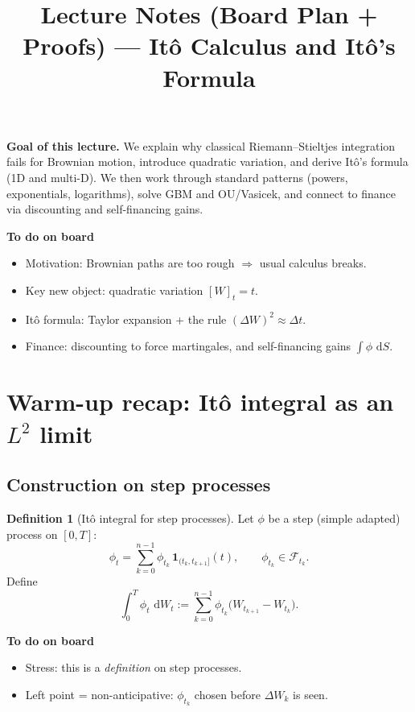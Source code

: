 \documentclass[11pt]{article}
\title{Lecture Notes (Board Plan + Proofs) --- It\^o Calculus and It\^o's Formula}
\author{}
\date{}
\newcommand{\F}{\mathcal{F}}
\newcommand{\1}{\mathbf{1}}
\newcommand{\dd}{\,\mathrm{d}}
\numberwithin{equation}{section}
\theoremstyle{plain}
\theoremstyle{definition}
\newtheorem{definition}[theorem]{Definition}
\theoremstyle{remark}
\begin{document}
\maketitle
\vspace{-1em}

\noindent\textbf{Goal of this lecture.}
We explain why classical Riemann--Stieltjes integration fails for Brownian motion,
introduce quadratic variation, and derive It\^o's formula (1D and multi-D).
We then work through standard patterns (powers, exponentials, logarithms),
solve GBM and OU/Vasicek, and connect to finance via discounting and self-financing gains.

\textbf{To do on board}
\begin{itemize}[leftmargin=2em]
  \item Motivation: Brownian paths are too rough $\Rightarrow$ usual calculus breaks.
  \item Key new object: quadratic variation $[W]_t = t$.
  \item It\^o formula: Taylor expansion + the rule $(\Delta W)^2 \approx \Delta t$.
  \item Finance: discounting to force martingales, and self-financing gains $\int \phi\,\dd S$.
\end{itemize}


\section{Warm-up recap: It\^o integral as an $L^2$ limit}

\subsection{Construction on step processes}

\begin{definition}[It\^o integral for step processes]
Let $\phi$ be a step (simple adapted) process on $[0,T]$:
\[
\phi_t=\sum_{k=0}^{n-1}\phi_{t_k}\,\1_{(t_k,t_{k+1}]}(t),
\qquad \phi_{t_k}\in\F_{t_k}.
\]
Define
\[
\int_0^T \phi_t\,\dd W_t
:=\sum_{k=0}^{n-1}\phi_{t_k}\big(W_{t_{k+1}}-W_{t_k}\big).
\]
\end{definition}

\textbf{To do on board}
\begin{itemize}[leftmargin=2em]
  \item Stress: this is a \emph{definition} on step processes.
  \item Left point = non-anticipative: $\phi_{t_k}$ chosen before $\Delta W_k$ is seen.
\end{itemize}
\end{document}
